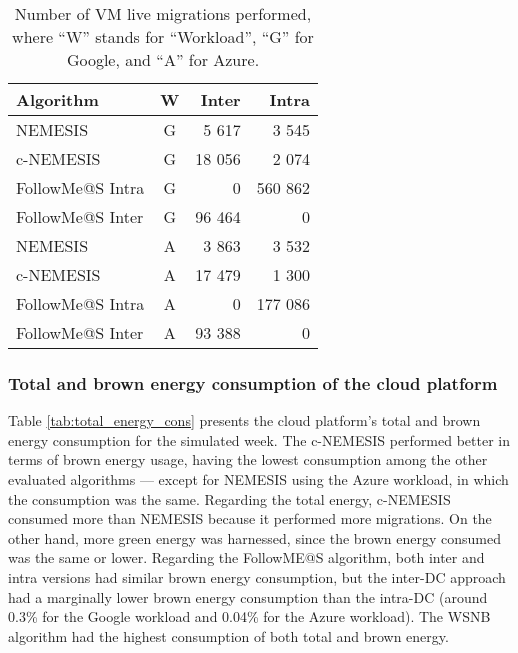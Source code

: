 \begin{table}[!ht]
\caption{Number of VM live migrations performed, where ``W'' stands for ``Workload'', ``G'' for Google, and ``A'' for Azure. }\label{tab:amount_migs} \centering
\begin{tabular}{|l|c|r|r|}
  \hline
  \textbf{Algorithm} & \textbf{W}  & \textbf{Inter} & \textbf{Intra}   \\
  \hline
  NEMESIS  & G & 5 617  & 3 545 \\
  \hline
  c-NEMESIS & G & 18 056  & 2 074 \\
  \hline
  FollowMe@S Intra  & G & 0  & 560 862 \\
  \hline
  FollowMe@S Inter  & G & 96 464 & 0 \\
  \hline
  NEMESIS & A & 3 863 & 3 532 \\
  \hline
  c-NEMESIS & A & 17 479  & 1 300 \\
  \hline
  FollowMe@S Intra  & A & 0  & 177 086 \\
  \hline
  FollowMe@S Inter   & A & 93 388 & 0 \\
  \hline
\end{tabular}
\end{table}

\subsubsection{Total and brown energy consumption of the cloud platform}

Table \ref{tab:total_energy_cons} presents the cloud platform's total and brown energy consumption for the simulated week. The c-NEMESIS performed better in terms of brown energy usage, having the lowest consumption among the other evaluated algorithms --- except for NEMESIS using the Azure workload, in which the consumption was the same. Regarding the total energy, c-NEMESIS consumed more than NEMESIS because it performed more migrations. On the other hand, more green energy was harnessed, since the brown energy consumed was the same or lower. Regarding the FollowME@S algorithm, both inter and intra versions had similar brown energy consumption, but the inter-DC approach had a marginally lower brown energy consumption than the intra-DC (around 0.3\% for the Google workload and 0.04\% for the Azure workload). The WSNB algorithm had the highest consumption of both total and brown energy.

